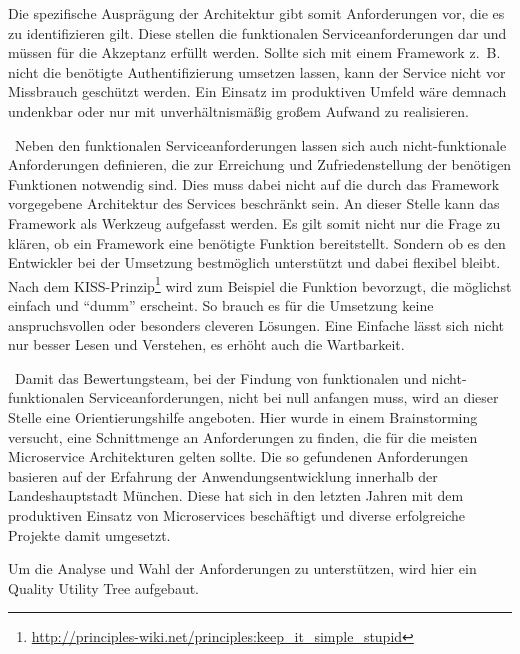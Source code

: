 
Die spezifische Ausprägung der Architektur gibt somit Anforderungen vor, die es zu identifizieren gilt. Diese stellen die funktionalen Serviceanforderungen dar und müssen für die Akzeptanz erfüllt werden. Sollte sich mit einem Framework z.~B. nicht die benötigte Authentifizierung umsetzen lassen, kann der Service nicht vor Missbrauch geschützt werden. Ein Einsatz im produktiven Umfeld wäre demnach undenkbar oder nur mit unverhältnismäßig großem Aufwand zu realisieren.

\
Neben den funktionalen Serviceanforderungen lassen sich auch nicht-funktionale Anforderungen definieren, die zur Erreichung und Zufriedenstellung der benötigen Funktionen notwendig sind. Dies muss dabei nicht auf die durch das Framework vorgegebene Architektur des Services beschränkt sein. An dieser Stelle kann das Framework als Werkzeug aufgefasst werden. Es gilt somit nicht nur die Frage zu klären, ob ein Framework eine benötigte Funktion bereitstellt. Sondern ob es den Entwickler bei der Umsetzung bestmöglich unterstützt und dabei flexibel bleibt. Nach dem KISS-Prinzip\footnote{
\url{http://principles-wiki.net/principles:keep_it_simple_stupid}
} 
wird zum Beispiel die Funktion bevorzugt, die möglichst einfach und \enquote{dumm} erscheint. So brauch es für die Umsetzung keine anspruchsvollen oder besonders cleveren Lösungen. Eine Einfache lässt sich nicht nur besser Lesen und Verstehen, es erhöht auch die Wartbarkeit.  

\
Damit das Bewertungsteam, bei der Findung von funktionalen und nicht-funktionalen Serviceanforderungen, nicht bei null anfangen muss, wird an dieser Stelle eine Orientierungshilfe angeboten. Hier wurde in einem Brainstorming versucht, eine Schnittmenge an Anforderungen zu finden, die für die meisten Microservice Architekturen gelten sollte. 
Die so gefundenen Anforderungen basieren auf der Erfahrung der Anwendungsentwicklung innerhalb der Landeshauptstadt München. Diese hat sich in den letzten Jahren mit dem produktiven Einsatz von Microservices beschäftigt und diverse erfolgreiche Projekte damit umgesetzt.   

Um die Analyse und Wahl der Anforderungen zu unterstützen, wird hier ein Quality Utility Tree aufgebaut.

